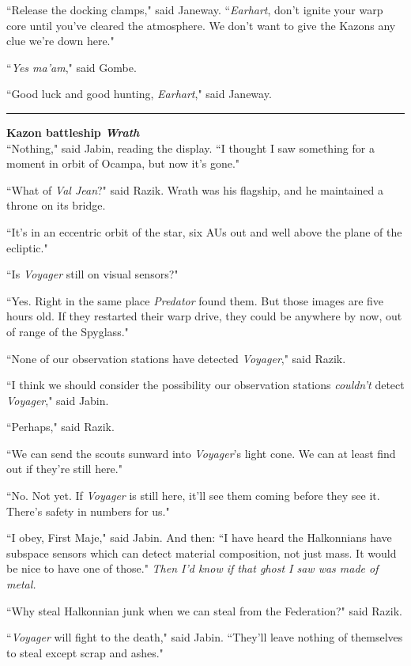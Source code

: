 \documentclass[twoside,letterpaper,12pt]{memoir}
\begin{document}
``Release the docking clamps," said Janeway. ``\textit{Earhart}, don't ignite your warp core until you've cleared the atmosphere. We don't want to give the Kazons any clue we're down here."

``\textit{Yes ma'am}," said Gombe.

``Good luck and good hunting, \textit{Earhart}," said Janeway.

\fancybreak{\rule{3cm}{0.4 pt}}
\noindent\textbf{Kazon battleship \textit{Wrath}}\\

``Nothing," said Jabin, reading the display. ``I thought I saw something for a moment in orbit of Ocampa, but now it’s gone."

``What of \textit{Val Jean}?" said Razik. Wrath was his flagship, and he maintained a throne on its bridge.

``It's in an eccentric orbit of the star, six AUs out and well above the plane of the ecliptic."

``Is \textit{Voyager} still on visual sensors?"

``Yes. Right in the same place \textit{Predator} found them. But those images are five hours old. If they restarted their warp drive, they could be anywhere by now, out of range of the Spyglass."

``None of our observation stations have detected \textit{Voyager}," said Razik.

``I think we should consider the possibility our observation stations \textit{couldn't} detect \textit{Voyager}," said Jabin.

``Perhaps," said Razik.

``We can send the scouts sunward into \textit{Voyager}'s light cone. We can at least find out if they're still here."

``No. Not yet. If \textit{Voyager} is still here, it'll see them coming before they see it. There's safety in numbers for us."

``I obey, First Maje," said Jabin. And then: ``I have heard the Halkonnians have subspace sensors which can detect material composition, not just mass. It would be nice to have one of those." \textit{Then I’d know if that ghost I saw was made of metal.}

``Why steal Halkonnian junk when we can steal from the Federation?" said Razik.

``\textit{Voyager} will fight to the death," said Jabin. ``They'll leave nothing of themselves to steal except scrap and ashes."
\end{document}
